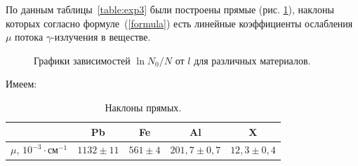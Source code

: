 \documentclass[a4paper, 12pt]{article}%
\begin{document}
	
		По данным таблицы~\ref{table:exp3} были построены прямые (рис. \ref{fig:graph}), наклоны которых согласно формуле~(\ref{formula}) есть линейные коэффициенты ослабления $\mu$ потока $\gamma$-излучения в веществе.
	
\newpage
	
		\begin{figure}[h!]
			\caption{Графики зависимостей $\ln N_0/N$ от $l$ для различных материалов.}\label{fig:graph}
		\end{figure}
			
		Имеем:
		\begin{table}[!h]
		\begin{center}
			\caption{Наклоны прямых.}
			\label{table:final}
			\begin{tabular}{|c|c|c|c|c|}
				\hline
				& Pb          & Fe         & Al             & X              \\ \hline
				$\mu$, $10^{-3}\cdot \text{см}^{-1}$ & $1132\pm11$ & $561\pm 4$ & $201,7\pm 0,7$ & $12,3 \pm 0,4$ \\ \hline
			\end{tabular}
		\end{center}
		\end{table}

	
\newpage
\end{document}
